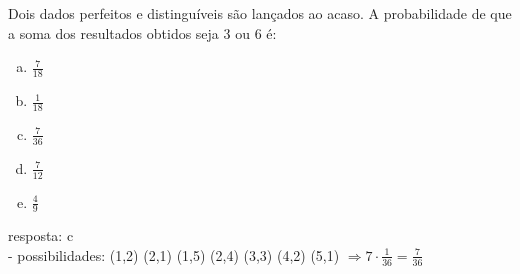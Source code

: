 \begin{ex}
 Dois dados perfeitos e distinguíveis são lançados ao acaso. A probabilidade de que a soma dos resultados obtidos seja 3 ou 6 é:
    \begin{enumerate}[(a)]
    \item $\frac{7}{18}$
    \item $\frac{1}{18}$
    \item $\frac{7}{36}$
    \item $\frac{7}{12}$
    \item $\frac{4}{9}$
    \end{enumerate}
      \begin{sol}
        resposta: c \\
         - possibilidades: (1,2) (2,1) (1,5) (2,4) (3,3) (4,2) (5,1) $\Longrightarrow 7\cdot\frac{1}{36}=\frac{7}{36}$
      \end{sol}
\end{ex}